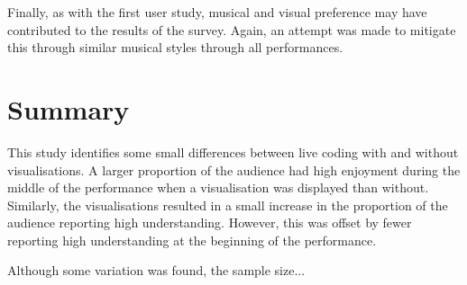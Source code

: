 Finally, as with the first user study, musical and visual preference may have contributed to the results of the survey. Again, an attempt was made to mitigate this through similar musical styles through all performances.

\section{Summary}

This study identifies some small differences between live coding with and without visualisations. A larger proportion of the audience had high enjoyment during the middle of the performance when a visualisation was displayed than without. Similarly, the visualisations resulted in a small increase in the proportion of the audience reporting high understanding. However, this was offset by fewer reporting high understanding at the beginning of the performance. 

Although some variation was found, the sample size... \more









